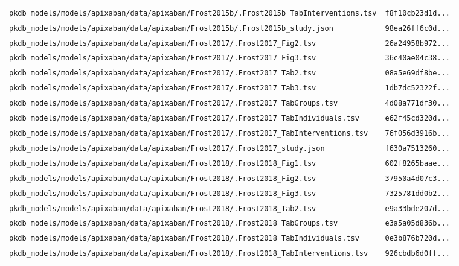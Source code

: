 \documentclass{article}
\begin{document}
\begin{longtable}{ll}
\texttt{pkdb\_models/models/apixaban/data/apixaban/Frost2015b/.Frost2015b\_TabInterventions.tsv} & \texttt{f8f10cb23d1d...} \\
\texttt{pkdb\_models/models/apixaban/data/apixaban/Frost2015b/.Frost2015b\_study.json} & \texttt{98ea26ff6c0d...} \\
\texttt{pkdb\_models/models/apixaban/data/apixaban/Frost2017/.Frost2017\_Fig2.tsv} & \texttt{26a24958b972...} \\
\texttt{pkdb\_models/models/apixaban/data/apixaban/Frost2017/.Frost2017\_Fig3.tsv} & \texttt{36c40ae04c38...} \\
\texttt{pkdb\_models/models/apixaban/data/apixaban/Frost2017/.Frost2017\_Tab2.tsv} & \texttt{08a5e69df8be...} \\
\texttt{pkdb\_models/models/apixaban/data/apixaban/Frost2017/.Frost2017\_Tab3.tsv} & \texttt{1db7dc52322f...} \\
\texttt{pkdb\_models/models/apixaban/data/apixaban/Frost2017/.Frost2017\_TabGroups.tsv} & \texttt{4d08a771df30...} \\
\texttt{pkdb\_models/models/apixaban/data/apixaban/Frost2017/.Frost2017\_TabIndividuals.tsv} & \texttt{e62f45cd320d...} \\
\texttt{pkdb\_models/models/apixaban/data/apixaban/Frost2017/.Frost2017\_TabInterventions.tsv} & \texttt{76f056d3916b...} \\
\texttt{pkdb\_models/models/apixaban/data/apixaban/Frost2017/.Frost2017\_study.json} & \texttt{f630a7513260...} \\
\texttt{pkdb\_models/models/apixaban/data/apixaban/Frost2018/.Frost2018\_Fig1.tsv} & \texttt{602f8265baae...} \\
\texttt{pkdb\_models/models/apixaban/data/apixaban/Frost2018/.Frost2018\_Fig2.tsv} & \texttt{37950a4d07c3...} \\
\texttt{pkdb\_models/models/apixaban/data/apixaban/Frost2018/.Frost2018\_Fig3.tsv} & \texttt{7325781dd0b2...} \\
\texttt{pkdb\_models/models/apixaban/data/apixaban/Frost2018/.Frost2018\_Tab2.tsv} & \texttt{e9a33bde207d...} \\
\texttt{pkdb\_models/models/apixaban/data/apixaban/Frost2018/.Frost2018\_TabGroups.tsv} & \texttt{e3a5a05d836b...} \\
\texttt{pkdb\_models/models/apixaban/data/apixaban/Frost2018/.Frost2018\_TabIndividuals.tsv} & \texttt{0e3b876b720d...} \\
\texttt{pkdb\_models/models/apixaban/data/apixaban/Frost2018/.Frost2018\_TabInterventions.tsv} & \texttt{926cbdb6d0ff...} \\

\end{longtable}
\end{document}
